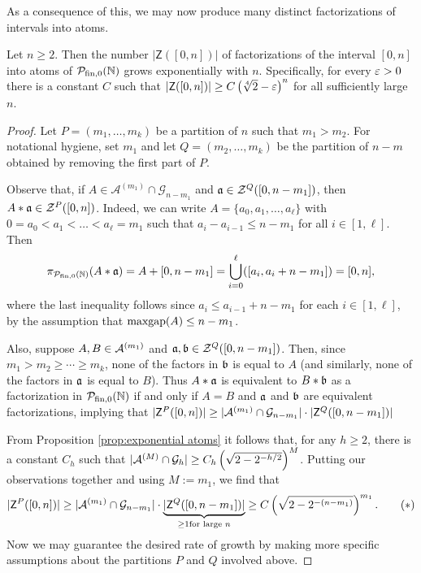 As a consequence of this, we may now produce many distinct factorizations of intervals into atoms.

\begin{thm} \label{thm:exponential intervals}
Let $n\ge 2$.
Then the number $|\mathsf{Z}([0,n])|$ of factorizations of the interval $[0,n]$ into atoms of $\PN$ grows exponentially with $n$.
Specifically, for every $\e>0$ there is a constant $C$  such that $|\mathsf{Z}([0,n])| \ge C \left(\sqrt[4]{2}-\e\right)^n$ for all sufficiently large $n$.
\end{thm}

\begin{proof}
Let $P = (m_1,\dots, m_k)$ be a partition of $n$ such that $m_1 > m_2$.
For notational hygiene, set $m_1$ and let $Q = (m_2,\dots, m_k)$ be the partition of $n-m$ obtained by removing the first part of $P$.

Observe that, if $A\in \mathcal{A}^{(m_1)}\cap \mathcal{G}_{n-m_1}$ and $\aa\in \Z^Q([0,n-m_1])$, then $A*\aa\in \Z^P([0,n])$.
Indeed, we can write $A = \{a_0,a_1,\dots, a_\ell\}$ with $0 =a_0 < a_1 <\dots < a_\ell = m_1$ such that $a_i - a_{i-1} \le n-m_1$ for all $i\in[1,\ell]$.
Then 
\[\pi_\PN(A*\aa) = A + [0,n-m_1] = \bigcup_{i=0}^\ell ([a_i,a_i+n-m_1]) = [0,n], \]
where the last inequality follows since $a_i \le a_{i-1} + n-m_1$ for each $i\in [1,\ell]$, by the assumption that $\maxgap(A) \le n-m_1$.

Also, suppose $A,B\in \A^{(m_1)}$ and $\aa,\bb\in \Z^Q([0,n-m_1])$.
Then, since $m_1 > m_2 \ge \cdots \ge m_k$, none of the factors in $\bb$ is equal to $A$ (and similarly, none of the factors in $\aa$ is equal to $B$).
Thus $A*\aa$ is equivalent to $B*\bb$ as a factorization in $\PN$ if and only if $A=B$ and $\aa$ and $\bb$ are equivalent factorizations, implying that $|\mathsf{Z}^P([0,n])| \ge |\A^{(m_1)} \cap \mathcal{G}_{n-m_1}| \cdot |\mathsf{Z}^Q([0,n-m_1])|$

From Proposition \ref{prop:exponential atoms} it follows that, for any $h\ge 2$, there is a constant $C_h$ such that $|\A^{(M)}\cap \mathcal{G}_h| \ge C_h \left(\sqrt{2-2^{-h/2}}\right)^M$.
Putting our observations together and using $M := m_1$, we find that
\[ |\mathsf{Z}^{P}([0,n])|
\ge |\A^{(m_1)}\cap \mathcal{G}_{n-m_1}| \cdot \underbrace{|\mathsf{Z}^Q([0,n-m_1])|}_{\ge 1 \textrm{for large $n$}} 
\ge C\left(\sqrt{2-2^{-(n-m_1)}}\right)^{m_1}. \tag{$*$}\]
Now we may guarantee the desired rate of growth by making more specific assumptions about the partitions $P$ and $Q$ involved above.


\end{proof}
